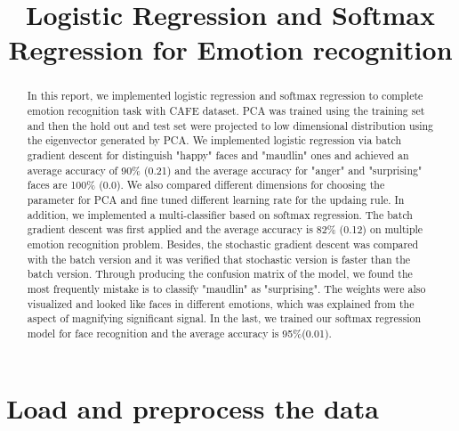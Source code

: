 \documentclass{article}
\title{Logistic Regression and Softmax Regression for Emotion recognition}
\begin{document}
\maketitle

\begin{abstract}
In this report, we implemented logistic regression and softmax regression to complete emotion recognition task with CAFE dataset. PCA was trained using the training set and then the hold out and test set were projected to low dimensional distribution using the eigenvector generated by PCA. We implemented logistic regression via batch gradient descent for distinguish "happy" faces and "maudlin" ones and achieved an average accuracy of 90\% (0.21) and the average accuracy for "anger" and "surprising" faces are 100\% (0.0).  We also compared different dimensions for choosing the parameter for PCA and fine tuned different learning rate for the updaing rule.
In addition, we implemented a multi-classifier based on softmax regression. The batch gradient descent was first applied and the average accuracy is 82\% (0.12) on multiple emotion recognition problem.
Besides, the stochastic gradient descent was compared with the batch version and it was verified that stochastic version is faster than the batch version.  Through producing the confusion matrix of the model, we found the most frequently mistake is to classify "maudlin" as "surprising". The weights were also visualized and looked like faces in different emotions, which was explained from the aspect of magnifying significant signal. In the last, we trained our softmax regression model for face recognition and the average accuracy is 95\%(0.01).

\end{abstract}

\section{Load and preprocess the data}
\end{document}
